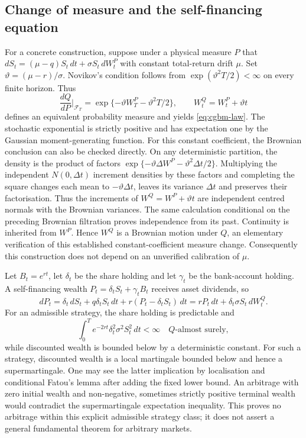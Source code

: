 \documentclass[11pt]{article}
\begin{document}
\subsection{Change of measure and the self-financing equation}

For a concrete construction, suppose under a physical measure $P$ that
$dS_t=(\mu-q)S_t\,dt+\sigma S_t\,dW_t^P$ with constant total-return drift
$\mu$. Set $\vartheta=(\mu-r)/\sigma$. Novikov's condition follows from
$\exp(\vartheta^2T/2)<\infty$ on every finite horizon. Thus
\begin{equation}
 \frac{dQ}{dP}\bigg|_{\mathcal F_T}
 =\exp\{-\vartheta W_T^P-\vartheta^2T/2\},\qquad
 W_t^Q=W_t^P+\vartheta t
 \label{eq:cgbm-rn}
\end{equation}
defines an equivalent probability measure and yields
\eqref{eq:cgbm-law}. The stochastic exponential is strictly positive
and has expectation one by the Gaussian moment-generating function.
For this constant coefficient, the Brownian conclusion can also be
checked directly. On any deterministic partition, the density is the
product of factors
$\exp\{-\vartheta\Delta W^P-\vartheta^2\Delta t/2\}$.
Multiplying the independent $N(0,\Delta t)$ increment densities by these
factors and completing the square changes each mean to
$-\vartheta\Delta t$, leaves its variance $\Delta t$ and preserves their
factorisation. Thus the increments of $W^Q=W^P+\vartheta t$ are independent
centred normals with the Brownian variances. The same calculation
conditional on the preceding Brownian filtration proves independence
from its past. Continuity is inherited from $W^P$. Hence $W^Q$ is a
Brownian motion under $Q$, an elementary verification of this established
constant-coefficient measure change.
Consequently this construction does not depend on an unverified
calibration of $\mu$.

Let $B_t=e^{rt}$, let $\delta_t$ be the share holding and let $\gamma_t$
be the bank-account holding. A self-financing wealth $P_t=\delta_tS_t+
\gamma_tB_t$ receives asset dividends, so
\begin{equation}
 dP_t=\delta_t\,dS_t+q\delta_tS_t\,dt+
 r(P_t-\delta_tS_t)\,dt
 =rP_t\,dt+\delta_t\sigma S_t\,dW_t^Q.
 \label{eq:cgbm-self-financing}
\end{equation}
For an admissible strategy, the share holding is predictable and
\begin{equation}
 \int_0^T e^{-2rt}\delta_t^2\sigma^2S_t^2\,dt<\infty
 \quad Q\text{-almost surely},\label{eq:cgbm-admissible-integrand}
\end{equation}
while discounted wealth is bounded below by a deterministic constant. For such a strategy, discounted
wealth is a local martingale bounded below and hence a supermartingale.
One may see the latter implication by localisation and conditional
Fatou's lemma after adding the fixed lower bound. An arbitrage with zero
initial wealth and non-negative, sometimes strictly positive terminal
wealth would contradict the supermartingale expectation inequality.
This proves no arbitrage within this explicit admissible strategy class;
it does not assert a general fundamental theorem for arbitrary markets.
\end{document}
